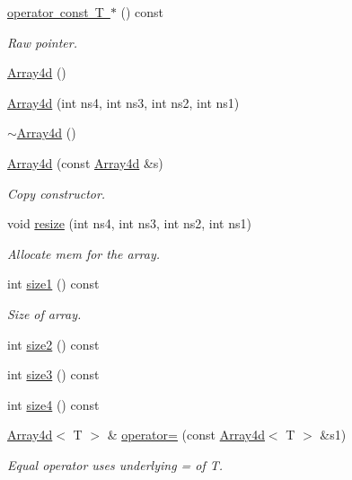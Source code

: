 \begin{DoxyCompactItemize}
\mbox{\hyperlink{classXMLArray_1_1Array4d_abe07755f692bf1df5acf5b8b9cd266cb}{operator const T $\ast$}} () const
\begin{DoxyCompactList}\small\item\em Raw pointer. \end{DoxyCompactList}\item 
\mbox{\hyperlink{classXMLArray_1_1Array4d_a4ce7f5a0bcb93fd0bd98a5fa0eb09a3d}{Array4d}} ()
\item 
\mbox{\hyperlink{classXMLArray_1_1Array4d_a409005374380cbfb8553f3237db7990b}{Array4d}} (int ns4, int ns3, int ns2, int ns1)
\item 
\mbox{\hyperlink{classXMLArray_1_1Array4d_a80523fcfbd3cf8493a2f5928dd9a3f15}{$\sim$\+Array4d}} ()
\item 
\mbox{\hyperlink{classXMLArray_1_1Array4d_aa288af6ef6ecbd04554a984ce1514c01}{Array4d}} (const \mbox{\hyperlink{classXMLArray_1_1Array4d}{Array4d}} \&s)
\begin{DoxyCompactList}\small\item\em Copy constructor. \end{DoxyCompactList}\item 
void \mbox{\hyperlink{classXMLArray_1_1Array4d_a8726b8005ecb501662b5e76873702480}{resize}} (int ns4, int ns3, int ns2, int ns1)
\begin{DoxyCompactList}\small\item\em Allocate mem for the array. \end{DoxyCompactList}\item 
int \mbox{\hyperlink{classXMLArray_1_1Array4d_a27899b6dccfd5d85d299da80da9a4c14}{size1}} () const
\begin{DoxyCompactList}\small\item\em Size of array. \end{DoxyCompactList}\item 
int \mbox{\hyperlink{classXMLArray_1_1Array4d_a18c3f8237c652b642c5de6df15764c34}{size2}} () const
\item 
int \mbox{\hyperlink{classXMLArray_1_1Array4d_ae9c6211389f5a1fd2bc756bb5e7b53b1}{size3}} () const
\item 
int \mbox{\hyperlink{classXMLArray_1_1Array4d_abcaa3187b7b1b4b36997937c7597f393}{size4}} () const
\item 
\mbox{\hyperlink{classXMLArray_1_1Array4d}{Array4d}}$<$ T $>$ \& \mbox{\hyperlink{classXMLArray_1_1Array4d_a3231647c370f838502526de102af1b23}{operator=}} (const \mbox{\hyperlink{classXMLArray_1_1Array4d}{Array4d}}$<$ T $>$ \&s1)
\begin{DoxyCompactList}\small\item\em Equal operator uses underlying = of T. \end{DoxyCompactList}\item 

\end{DoxyCompactItemize}
